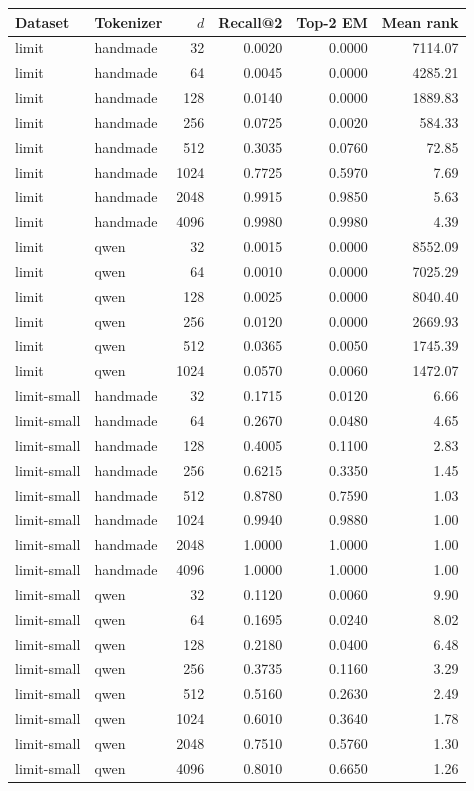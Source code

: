 \begin{tabular}{llrrrr}
\toprule
Dataset & Tokenizer & $d$ & Recall@2 & Top-2 EM & Mean rank \\
\midrule
limit & handmade & 32 & 0.0020 & 0.0000 & 7114.07 \\
limit & handmade & 64 & 0.0045 & 0.0000 & 4285.21 \\
limit & handmade & 128 & 0.0140 & 0.0000 & 1889.83 \\
limit & handmade & 256 & 0.0725 & 0.0020 & 584.33 \\
limit & handmade & 512 & 0.3035 & 0.0760 & 72.85 \\
limit & handmade & 1024 & 0.7725 & 0.5970 & 7.69 \\
limit & handmade & 2048 & 0.9915 & 0.9850 & 5.63 \\
limit & handmade & 4096 & 0.9980 & 0.9980 & 4.39 \\
limit & qwen & 32 & 0.0015 & 0.0000 & 8552.09 \\
limit & qwen & 64 & 0.0010 & 0.0000 & 7025.29 \\
limit & qwen & 128 & 0.0025 & 0.0000 & 8040.40 \\
limit & qwen & 256 & 0.0120 & 0.0000 & 2669.93 \\
limit & qwen & 512 & 0.0365 & 0.0050 & 1745.39 \\
limit & qwen & 1024 & 0.0570 & 0.0060 & 1472.07 \\
limit-small & handmade & 32 & 0.1715 & 0.0120 & 6.66 \\
limit-small & handmade & 64 & 0.2670 & 0.0480 & 4.65 \\
limit-small & handmade & 128 & 0.4005 & 0.1100 & 2.83 \\
limit-small & handmade & 256 & 0.6215 & 0.3350 & 1.45 \\
limit-small & handmade & 512 & 0.8780 & 0.7590 & 1.03 \\
limit-small & handmade & 1024 & 0.9940 & 0.9880 & 1.00 \\
limit-small & handmade & 2048 & 1.0000 & 1.0000 & 1.00 \\
limit-small & handmade & 4096 & 1.0000 & 1.0000 & 1.00 \\
limit-small & qwen & 32 & 0.1120 & 0.0060 & 9.90 \\
limit-small & qwen & 64 & 0.1695 & 0.0240 & 8.02 \\
limit-small & qwen & 128 & 0.2180 & 0.0400 & 6.48 \\
limit-small & qwen & 256 & 0.3735 & 0.1160 & 3.29 \\
limit-small & qwen & 512 & 0.5160 & 0.2630 & 2.49 \\
limit-small & qwen & 1024 & 0.6010 & 0.3640 & 1.78 \\
limit-small & qwen & 2048 & 0.7510 & 0.5760 & 1.30 \\
limit-small & qwen & 4096 & 0.8010 & 0.6650 & 1.26 \\
\bottomrule
\end{tabular}
